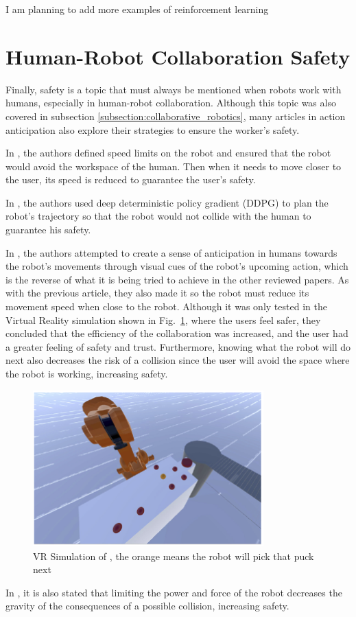 {\color{red} I am planning to add more examples of reinforcement learning}

\section{Human-Robot Collaboration Safety}

Finally, safety is a topic that must always be mentioned when robots work with humans, especially in human-robot collaboration. Although this topic was also covered in subsection \ref{subsection:collaborative_robotics}, many articles in action anticipation also explore their strategies to ensure the worker's safety.

In \cite{Zhang2022}, the authors defined speed limits on the robot and ensured that the robot would avoid the workspace of the human. Then when it needs to move closer to the user, its speed is reduced to guarantee the user's safety.

In \cite{Wu2023}, the authors used deep deterministic policy gradient (DDPG) to plan the robot's trajectory so that the robot would not collide with the human to guarantee his safety.

In \cite{Psarakis2022}, the authors attempted to create a sense of anticipation in humans towards the robot's movements through visual cues of the robot's upcoming action, which is the reverse of what it is being tried to achieve in the other reviewed papers. As with the previous article, they also made it so the robot must reduce its movement speed when close to the robot. Although it was only tested in the Virtual Reality simulation shown in Fig.~\ref{vr}, where the users feel safer, they concluded that the efficiency of the collaboration was increased, and the user had a greater feeling of safety and trust. Furthermore, knowing what the robot will do next also decreases the risk of a collision since the user will avoid the space where the robot is working, increasing safety.

\begin{figure}[H]
\centerline{\includegraphics[width=3.5in]{figs/reverse.PNG}}
\caption{VR Simulation of \cite{Psarakis2022}, the orange means the robot will pick that puck next}
\label{vr}
\end{figure}

In \cite{Mukherjee2022}, it is also stated that limiting the power and force of the robot decreases the gravity of the consequences of a possible collision, increasing safety.